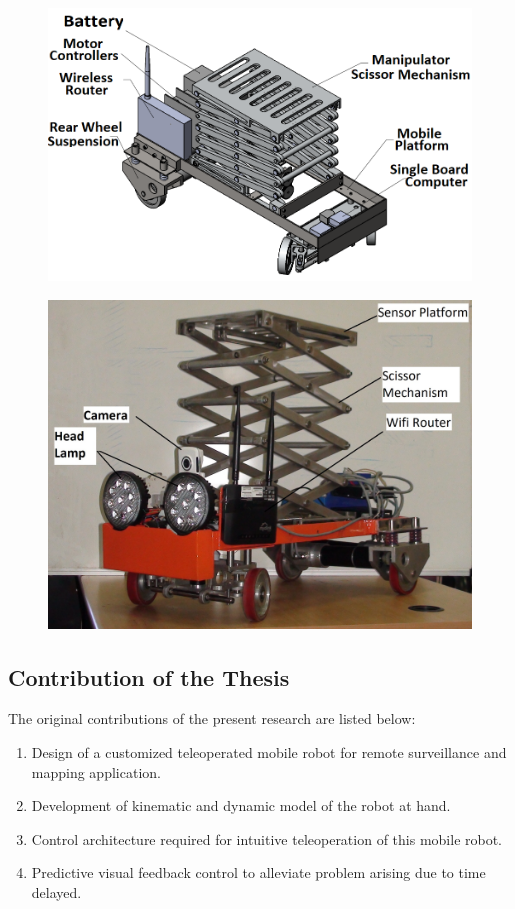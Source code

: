 \documentclass[12pt,a4paper, notitlepage]{article}
\begin{document}
	  \begin{figure}[ht]
	 	\centering
	 	
	 		\centering
	 		\includegraphics[width=.8\textwidth,keepaspectratio]{fig/robo3Dmodel}
	 		\label{fig:robo3Dmodel}
	 \end {figure}
 
	 	\begin{figure}
	 		\centering
	 		\includegraphics[width=.7\textwidth,keepaspectratio]{fig/roboActualN}
	 		\label{fig:roboActual}
	 	\end{figure}
	 
	 
	    


	\subsection{Contribution of the Thesis}
		The original contributions of the present research are listed below:
	\begin{enumerate}	
		\item Design of a customized teleoperated mobile robot for remote surveillance and mapping application.
		\item Development of kinematic and dynamic model of the robot at hand.
		\item Control architecture required for intuitive teleoperation of this mobile robot.
		\item Predictive visual feedback control to alleviate problem arising due to time delayed.		
	\end{enumerate}
\end{document}
